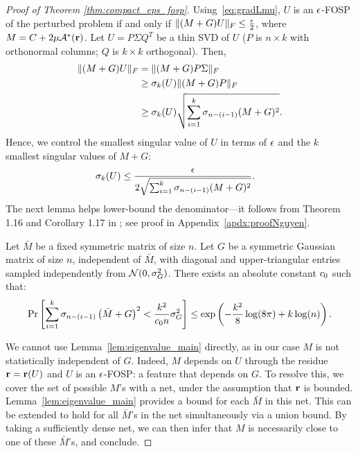 \begin{proof}[Proof of Theorem \ref{thm:compact_eps_fosp}]
	Using~\eqref{eq:gradLmu}, $U$ is an $\epsilon$-FOSP of the perturbed problem if and only if $\| (M+G)U\|_F \leq \frac{\epsilon}{2}$, where $M = C + 2\mu\mathcal{A}^*(\mathbf{r})$.
	Let $U = P \Sigma Q^T$ be a thin SVD of $U$ ($P$ is $n\times k$ with orthonormal columns; $Q$ is $k\times k$ orthogonal). Then,
	\begin{align*}
	\| (M+G)U\|_F & = \| (M+G) P \Sigma \|_F \\
	& \geq \sigma_k(U)\| (M+G) P\|_F \\
	& \geq  \sigma_k(U) \sqrt{\sum_{i=1}^k \sigma_{n-(i-1)}(M+G)^2}.
	\end{align*}
	Hence, we control the smallest singular value of $U$ in terms of $\epsilon$ and the $k$ smallest singular values of $M+G$:
	\begin{align}
		\sigma_k(U) & \leq \frac{\epsilon}{2\sqrt{\sum_{i=1}^{k}\sigma_{n-(i-1)}(M+G)^2}}.
		\label{eq:keyboundsigmak}
	\end{align}
	The next lemma helps lower-bound the denominator---it follows from Theorem 1.16 and Corollary 1.17 in \citep{nguyen2017repulsion}; see proof in Appendix~\ref{apdx:proofNguyen}.
	\begin{lemma}\label{lem:eigenvalue_main}
		Let $\bar M$ be a fixed symmetric matrix of size $n$. Let $G$ be a symmetric Gaussian matrix of size $n$, independent of $\bar M$, with diagonal and upper-triangular entries sampled independently from $\mathcal{N}(0,\sigma_G^2)$. There exists an absolute constant $c_0$ such that:
		\begin{align*}
		\operatorname{Pr}\left[{\sum_{i=1}^{k} \sigma_{n-(i-1)}\left(\bar M+G\right)^2 <  \frac{k^2}{c_0 n} \sigma_G^2 }\right] \leq \exp\left( - \frac{k^2}{8} \log(8 \pi) + k \log (n)\right).
		\end{align*}
	\end{lemma}
	We cannot use Lemma~\ref{lem:eigenvalue_main} directly, as in our case $M$ is not statistically independent of $G$. Indeed, $M$ depends on $U$ through the residue $\mathbf{r} = \mathbf{r}(U)$ and $U$ is an $\epsilon$-FOSP: a feature that depends on $G$.
	To resolve this, we cover the set of possible $M$'s with a net, under the assumption that $\mathbf{r}$ is bounded. Lemma~\ref{lem:eigenvalue_main} provides a bound for each $\bar M$ in this net. This can be extended to hold for all $\bar M$'s in the net simultaneously via a union bound. By taking a sufficiently dense net, we can then infer that $M$ is necessarily close to one of these $\bar M$'s, and conclude.
	

\end{proof}
